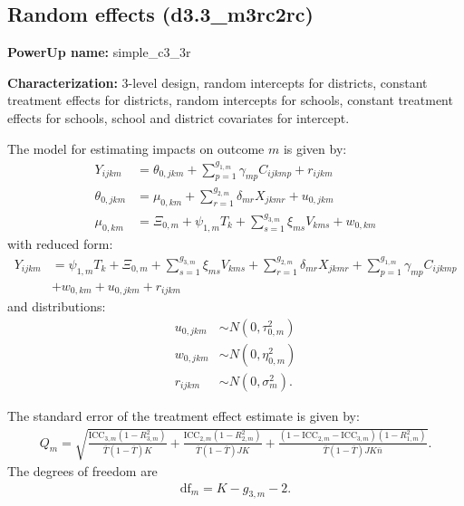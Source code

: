 \documentclass[12pt]{article}
\begin{document}

\subsection{Random effects (d3.3\_m3rc2rc)}

\textbf{PowerUp name:} simple\_c3\_3r

\textbf{Characterization:} 3-level design, random intercepts for districts, constant treatment effects for districts, random intercepts for schools, constant treatment effects for schools, school and district covariates for intercept.

The model for estimating impacts on outcome $m$ is given by:
\begin{align}\label{eqn:bi12c_model}
Y_{ijkm} &=  \theta_{0,jkm} + \sum_{p=1}^{g_{1,m}} \gamma_{mp} C_{ijkmp} + r_{ijkm}\\
\nonumber \theta_{0,jkm} &= \mu_{0,km} + \sum_{r=1}^{g_{2,m}} \delta_{mr} X_{jkmr} + u_{0,jkm}\\
\nonumber \mu_{0,km}  &= \Xi_{0,m} + \psi_{1,m} T_{k} + \sum_{s=1}^{g_{3,m}} \xi_{ms} V_{kms} + w_{0,km}
\end{align}
with reduced form:
\begin{align}
Y_{ijkm} &= \psi_{1,m} T_{k} + \Xi_{0,m} + \sum_{s=1}^{g_{3,m}} \xi_{ms} V_{kms} + \sum_{r=1}^{g_{2,m}} \delta_{mr} X_{jkmr} + \sum_{p=1}^{g_{1,m}} \gamma_{mp} C_{ijkmp}\\
\nonumber &+ w_{0,km} + u_{0,jkm} + r_{ijkm}
\end{align}
and distributions:
\begin{align}
u_{0,jkm} &\sim N\left(0, \tau^2_{0,m}\right)\\
\nonumber w_{0,jkm} &\sim N\left(0, \eta^2_{0,m}\right)\\
\nonumber r_{ijkm} &\sim N\left(0, \sigma^2_m\right).
\end{align}

The standard error of the treatment effect estimate is given by:
\begin{align}
Q_m = \sqrt{
\frac{\text{ICC}_{3,m}(1 - R^2_{3,m})}{\bar{T}(1 - \bar{T}) K} +
\frac{\text{ICC}_{2,m}(1 - R^2_{2,m})}{\bar{T}(1 - \bar{T}) J K } +
\frac{(1-\text{ICC}_{2,m} - \text{ICC}_{3,m})(1-R^2_{1,m})}{\bar{T}(1 - \bar{T}) J K\bar{n}} }.\end{align}
The degrees of freedom are
\begin{align}\text{df}_m = K - g_{3,m} - 2.\end{align}
\end{document}
